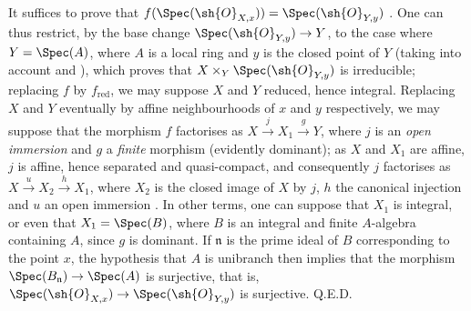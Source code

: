It suffices to prove that $f(\Spec(\sh{O}_{X,x}))=\Spec(\sh{O}_{Y,y})$ .
One can thus restrict, by the base change $\Spec(\sh{O}_{Y,y})\to Y$, to the case where $Y=\Spec(A)$, where $A$ is a local ring and $y$ is the closed point of $Y$ (taking into account  and ), which proves that $X\times_Y\Spec(\sh{O}_{Y,y})$ is irreducible; replacing $f$ by $f_{\mathrm{red}}$, we may suppose $X$ and $Y$ reduced, hence integral.
Replacing $X$ and $Y$ eventually by affine neighbourhoods of $x$ and $y$ respectively, we may suppose  that the morphism $f$ factorises as $X\xrightarrow{j}X_1\xrightarrow{g}Y$, where $j$ is an \emph{open immersion} and $g$ a \emph{finite} morphism (evidently dominant); as $X$ and $X_1$ are affine, $j$ is affine, hence separated and quasi-compact, and consequently $j$ factorises as $X\xrightarrow{u}X_2\xrightarrow{h}X_1$, where $X_2$ is the closed image of $X$ by $j$, $h$ the canonical injection and $u$ an open immersion .
In other terms, one can suppose that $X_1$ is integral, or even that $X_1=\Spec(B)$, where $B$ is an integral and finite $A$-algebra containing $A$, since $g$ is dominant. If $\mathfrak{n}$ is the prime ideal of $B$ corresponding to the point $x$, the hypothesis that $A$ is unibranch then implies  that the morphism $\Spec(B_\mathfrak{n})\to\Spec(A)$ is surjective, that is, $\Spec(\sh{O}_{X,x})\to\Spec(\sh{O}_{Y,y})$ is surjective.
Q.E.D.

